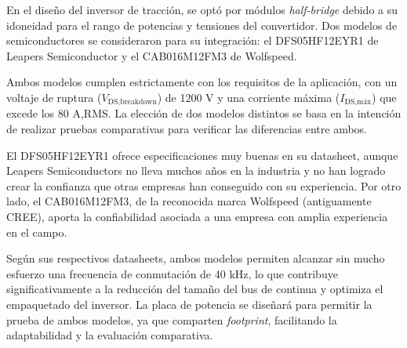 En el diseño del inversor de tracción, se optó por módulos \textit{half-bridge} debido a su idoneidad para el rango de potencias y tensiones del convertidor. Dos modelos de semiconductores se consideraron para su integración: el DFS05HF12EYR1 de Leapers Semiconductor y el CAB016M12FM3 de Wolfspeed.

Ambos modelos cumplen estrictamente con los requisitos de la aplicación, con un voltaje de ruptura (\(V_{\text{DS,breakdown}}\)) de 1200 V y una corriente máxima (\(I_{\text{DS,máx}}\)) que excede los 80 A,RMS. La elección de dos modelos distintos se basa en la intención de realizar pruebas comparativas para verificar las diferencias entre ambos.

El DFS05HF12EYR1 ofrece especificaciones muy buenas en su datasheet, aunque Leapers Semiconductors no lleva muchos años en la industria y no han logrado crear la confianza que otras empresas han conseguido con su experiencia. Por otro lado, el CAB016M12FM3, de la reconocida marca Wolfspeed (antiguamente CREE), aporta la confiabilidad asociada a una empresa con amplia experiencia en el campo.

Según sus respectivos datasheets, ambos modelos permiten alcanzar sin mucho esfuerzo una frecuencia de conmutación de 40 kHz, lo que contribuye significativamente a la reducción del tamaño del bus de continua y optimiza el empaquetado del inversor. La placa de potencia se diseñará para permitir la prueba de ambos modelos, ya que comparten \textit{footprint}, facilitando la adaptabilidad y la evaluación comparativa.

